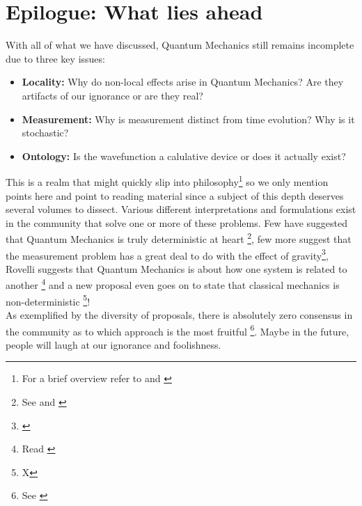 \chapter{Epilogue: What lies ahead}
With all of what we have  discussed, Quantum Mechanics still remains incomplete due to three key issues: 
\begin{itemize}
\item \textbf{Locality:} Why do non-local effects arise in Quantum Mechanics? Are they artifacts of our ignorance or are they real?
\item \textbf{Measurement:} Why is measurement distinct from time evolution? Why is it stochastic?
\item \textbf{Ontology:} Is the wavefunction a calulative device or does it actually exist?
\end{itemize}
This is a realm that might quickly slip into philosophy\footnote{For a brief overview refer to \cite{p27} and \cite{p28}} so we only mention points here and point to reading material since a subject of this depth deserves several volumes to dissect. Various different interpretations and formulations exist in the community that solve one or more of these problems. Few have suggested that Quantum Mechanics is truly deterministic at heart \footnote{See \cite{p26} and \cite{p24}}, few more suggest that the measurement problem has a great deal to do with the effect of gravity\footnote{\cite{text}}, Rovelli suggests that Quantum Mechanics is about how one system is related to another \footnote{Read \cite{p25}} and a new proposal even goes on to state that classical mechanics is non-deterministic \footnote{X}! 
\\
As exemplified by the diversity of proposals, there is absolutely zero consensus in the community as to which approach is the most fruitful \footnote{See \cite{p31}}. Maybe in the future, people will laugh at our ignorance and foolishness.
